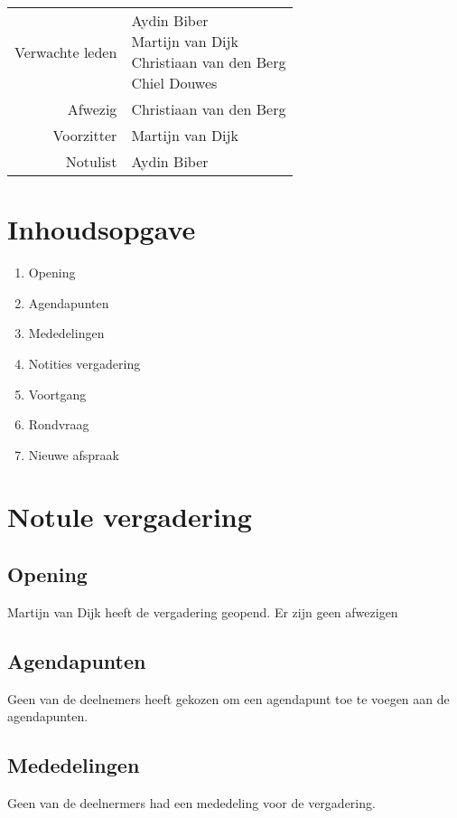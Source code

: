 \documentclass[dutch]{hu}
\date{21 januari 2016}
\subtitle{Notule 21-01-2016}
\begin{document}
\maketitle
\pagestyle{plain}

\begin{tabular}{ r | l }
Verwachte leden & \makecell[l]{
	Aydin Biber \\
	Martijn van Dijk \\
	Christiaan van den Berg \\
	Chiel Douwes
	} \\
Afwezig & Christiaan van den Berg \\
Voorzitter & Martijn van Dijk \\
Notulist & Aydin Biber \\
\end{tabular}

\chapter{Inhoudsopgave}
\begin{enumerate}
\item Opening
\item Agendapunten
\item Mededelingen
\item Notities vergadering
\item Voortgang
\item Rondvraag
\item Nieuwe afspraak
\end{enumerate}

\chapter{Notule vergadering}
\section{Opening}
Martijn van Dijk heeft de vergadering geopend. Er zijn geen afwezigen

\section{Agendapunten}
Geen van de deelnemers heeft gekozen om een agendapunt toe te voegen aan de agendapunten.

\section{Mededelingen}
Geen van de deelnermers had een mededeling voor de vergadering.
\end{document}

